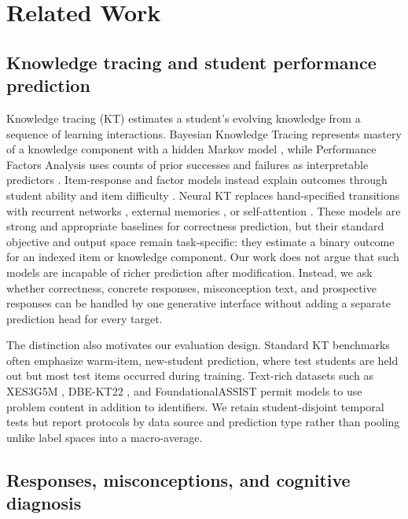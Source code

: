 \section{Related Work}
\label{sec:related-work}

\subsection{Knowledge tracing and student performance prediction}

Knowledge tracing (KT) estimates a student's evolving knowledge from a sequence
of learning interactions.  Bayesian Knowledge Tracing represents mastery of a
knowledge component with a hidden Markov model \citep{corbett1995knowledge},
while Performance Factors Analysis uses counts of prior successes and failures
as interpretable predictors \citep{pavlik2009performance}.  Item-response and
factor models instead explain outcomes through student ability and item
difficulty \citep{rasch1960probabilistic,vie2019knowledge}.  Neural KT replaces
hand-specified transitions with recurrent networks \citep{piech2015deep},
external memories \citep{zhang2017dynamic}, or self-attention
\citep{pandey2019self,ghosh2020context}.  These models are strong and appropriate
baselines for correctness prediction, but their standard objective and output
space remain task-specific: they estimate a binary outcome for an indexed item
or knowledge component.  Our work does not argue that such models are incapable
of richer prediction after modification.  Instead, we ask whether correctness,
concrete responses, misconception text, and prospective responses can be
handled by one generative interface without adding a separate prediction head
for every target.

The distinction also motivates our evaluation design.  Standard KT benchmarks
often emphasize warm-item, new-student prediction, where test students are held
out but most test items occurred during training.  Text-rich datasets such as
XES3G5M \citep{liu2023xes3g5m}, DBE-KT22
\citep{abdelrahman2022dbekt22}, and FoundationalASSIST
\citep{worden2026foundationalassist} permit models to use problem content in
addition to identifiers.  We retain student-disjoint temporal tests but report
protocols by data source and prediction type rather than pooling unlike label
spaces into a macro-average.

\subsection{Responses, misconceptions, and cognitive diagnosis}

